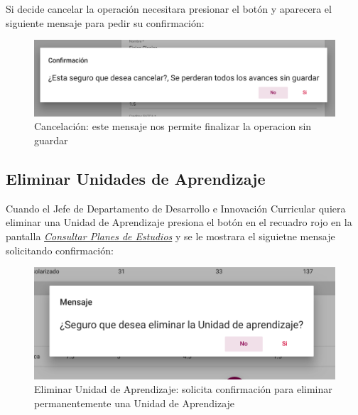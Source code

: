 Si decide cancelar la operación necesitara presionar el botón  y aparecera el siguiente mensaje para pedir su confirmación:\\
\begin{figure}[H]
    \centering
    \hypertarget{cancelarE}{\includegraphics[width=0.7\linewidth]{images/GUA/cancelar}}
    \caption{Cancelación: este mensaje nos permite finalizar la operacion sin guardar}
    \label{cancelarE}
\end{figure}
\newpage
\subsection{Eliminar Unidades de Aprendizaje}
Cuando el Jefe de Departamento de Desarrollo e Innovación Curricular quiera eliminar una Unidad de Aprendizaje presiona el botón  en el recuadro rojo en la pantalla \hyperlink{consultarUA}{\textit{Consultar Planes de Estudios}} y se le mostrara el siguietne mensaje solicitando confirmación:\\
\begin{figure}[H]
    \centering
    \hypertarget{EliminarUA}{\includegraphics[width=0.7\linewidth]{images/GUA/EliminarUA}}
    \caption{Eliminar Unidad de Aprendizaje: solicita confirmación para eliminar permanentemente una Unidad de Aprendizaje}
    \label{EliminarUA}
\end{figure}